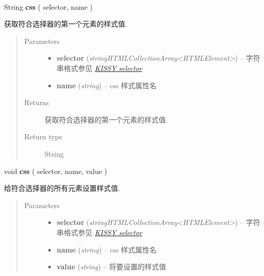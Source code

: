 \documentclass[letterpaper,10pt,english]{sphinxmanual}
\begin{document}
\begin{fulllineitems}
\label{api/core/dom/css:DOM.css}~
\begin{DUlineblock}{0em}
\item[] String \textbf{css} ( selector, name )
\item[] 获取符合选择器的第一个元素的样式值.
\end{DUlineblock}
\begin{quote}\begin{description}
\item[{Parameters}] \leavevmode\begin{itemize}
\item {}
\textbf{selector} (\emph{string\textbar{}HTMLCollection\textbar{}Array\textless{}HTMLElement\textgreater{}}) -- 字符串格式参见 {\hyperref[api/core/dom/selector:dom-selector]{\emph{KISSY selector}}}

\item {}
\textbf{name} (\emph{string}) -- css 样式属性名

\end{itemize}

\item[{Returns}] \leavevmode
获取符合选择器的第一个元素的样式值.

\item[{Return type}] \leavevmode
String

\end{description}\end{quote}

\begin{DUlineblock}{0em}
\item[] void \textbf{css} ( selector, name, value )
\item[] 给符合选择器的所有元素设置样式值.
\end{DUlineblock}
\begin{quote}\begin{description}
\item[{Parameters}] \leavevmode\begin{itemize}
\item {}
\textbf{selector} (\emph{string\textbar{}HTMLCollection\textbar{}Array\textless{}HTMLElement\textgreater{}}) -- 字符串格式参见 {\hyperref[api/core/dom/selector:dom-selector]{\emph{KISSY selector}}}

\item {}
\textbf{name} (\emph{string}) -- css 样式属性名

\item {}
\textbf{value} (\emph{string}) -- 将要设置的样式值


\end{itemize}
\end{description}
\end{quote}
\end{fulllineitems}
\end{document}
